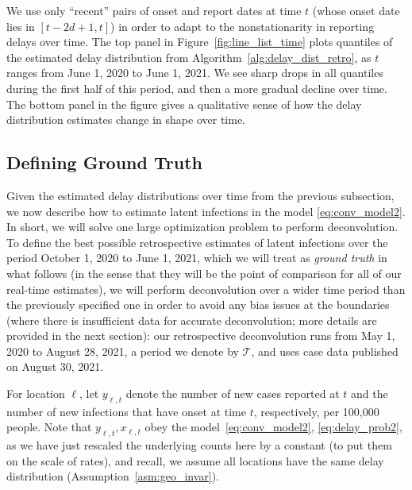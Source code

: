 \documentclass[sts]{imsart}
\def\T{\mathsf{T}}
\def\T{\mathcal{T}}
\theoremstyle{plain}
\theoremstyle{definition}
\theoremstyle{remark}
\begin{document}
We use only ``recent'' pairs of onset and report dates at time $t$ (whose onset
date lies in $[t-2d+1, t]$) in order to adapt to the nonstationarity in
reporting delays over time. The top panel in Figure~\ref{fig:line_list_time}
plots quantiles of the estimated delay distribution from
Algorithm~\ref{alg:delay_dist_retro}, as $t$ ranges from June 1, 2020 to June 1,
2021. We see sharp drops in all quantiles during the first half of this period,
and then a more gradual decline over time. The bottom panel in the figure gives
a qualitative sense of how the delay distribution estimates change in shape over
time.

\subsection{Defining Ground Truth}
\label{sec:ground_truth}

Given the estimated delay distributions over time from the previous subsection, 
we now describe how to estimate latent infections in the model
\eqref{eq:conv_model2}. In short, we will solve one large optimization problem
to perform deconvolution. To define the best possible retrospective estimates of
latent infections over the period October 1, 2020 to June 1, 2021, which we will
treat as \emph{ground truth} in what follows (in the sense that they will be the
point of comparison for all of our real-time estimates), we will perform
deconvolution over a wider time period than the previously specified one in
order to avoid any bias issues at the boundaries (where there is insufficient
data for accurate deconvolution; more details are provided in the next
section): our retrospective deconvolution runs from May 1, 2020 to August 28,
2021, a period we denote by $\T$, and uses case data published on August 30,
2021. 

For location $\ell$, let $y_{\ell,t}$ denote the number of new cases reported at
$t$ and the number of new infections that have onset at time $t$, respectively,
per 100,000 people. Note that $y_{\ell,t},x_{\ell,t}$ obey the
model~\eqref{eq:conv_model2}, \eqref{eq:delay_prob2}, as we have just rescaled
the underlying counts here by a constant (to put them on the scale of rates),
and recall, we assume all locations have the same delay distribution
(Assumption~\ref{asm:geo_invar}).
\end{document}
